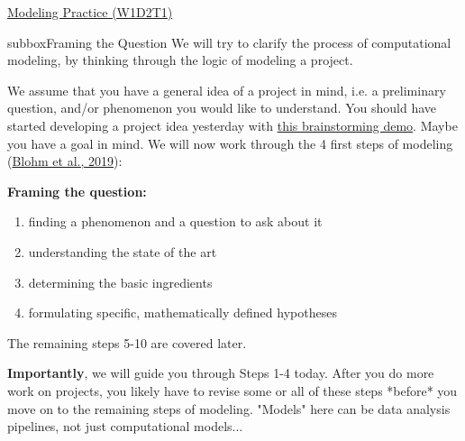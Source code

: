 \clearpage
\begin{textbox}{\href{https://compneuro.neuromatch.io/tutorials/W1D2_ModelingPractice/W1D2_Intro.html}{Modeling Practice (W1D2T1)} }
\begin{subbox}{subbox}{Framing the Question}
\scriptsize
We will try to clarify the process of computational modeling, by thinking through the logic of modeling a project.

We assume that you have a general idea of a project in mind, i.e. a preliminary question, and/or phenomenon you would like to understand. You should have started developing a project idea yesterday with \href{https://youtu.be/H6rSlZzlrgQ}{this brainstorming demo}. Maybe you have a goal in mind. We will now work through the 4 first steps of modeling (\href{https://doi.org/10.1523/ENEURO.0352-19.2019}{Blohm et al., 2019}): 

\textbf{Framing the question:}\\
\begin{enumerate}    \item 
 finding a phenomenon and a question to ask about it
    \item 
 understanding the state of the art
    \item 
 determining the basic ingredients
    \item 
 formulating specific, mathematically defined hypotheses
\end{enumerate}

The remaining steps 5-10 are covered later.

\textbf{Importantly}, we will guide you through Steps 1-4 today. After you do more work on projects, you likely have to revise some or all of these steps *before* you move on to the remaining steps of modeling.  "Models" here can be data analysis pipelines, not just computational models...

\end{subbox}
\end{textbox}
